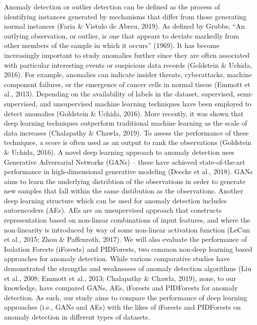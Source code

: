 \documentclass[letterpaper]{article}
\begin{document}
Anomaly detection or outlier detection can be defined as the process of identifying instances generated by mechanisms that differ from those
generating normal instances (Faria \& Vistulo de Abreu, 2019).
As defined by Grubbs, “An outlying observation, or outlier, is one that appears to deviate markedly from other members of the
sample in which it occurs” (1969).
It has become increasingly important to study anomalies further since they are often associated with particular interesting events or suspicious data records 
(Goldstein \& Uchida, 2016). 
For example, anomalies can indicate insider threats, cyberattacks, machine component failures, or the emergence of cancer cells in normal tissue (Emmott et al., 2013). 
Depending on the availability of labels in the dataset, supervised, semi-supervised, and unsupervised machine learning techniques have been employed to detect anomalies (Goldstein \& Uchida, 2016). 
More recently, it was shown that deep learning techniques outperform traditional machine learning as the scale of data increases (Chalapathy \& Chawla, 2019).
To assess the performance of these techniques, a score is often used as an output to rank the observations (Goldstein \& Uchida, 2016).
A novel deep learning approach to anomaly detection uses Generative Adversarial Networks (GANs) – these have achieved state-of-the-art performance in high-dimensional generative modeling (Deecke et al., 2018).
GANs aims to learn the underlying distribtion of the observations in order to generate new samples that fall within the same distibution as the observations.
Another deep learning structure which can be used for anomaly detection includes autoencoders (AEs).
AEs are an unsupervised approach that constructs representation based on non-linear combinations of input features, and where the non-linearity is introduced by way of some non-linear activation function (LeCun et al., 2015; Zhou \& Paffenroth, 2017).
We will also evaluate the performance of Isolation Forests (iForests) and PIDForests, two common non-deep learning based approaches for anomaly detection.
While various comparative studies have demonstrated the strengths and weaknesses of anomaly detection algorithms
(Liu et al., 2008; Emmott et al., 2013; Chalapathy \& Chawla, 2019), none, to our knowledge, have compared GANs, AEs, iForests and PIDForests for anomaly detection.
As such, our study aims to compare the performance of deep learning approaches (i.e., GANs and AEs) with the likes of iForests and PIDForests on anomaly detection in different types of datasets.
\end{document}
